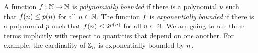 
A function $f : \mathbb{N} \to \mathbb{N}$ is \emph{polynomially bounded} if there is a
polynomial $p$ such that $f(n) \leq p(n)$ for all $n\in\mathbb{N}$.
The function $f$ is \emph{exponentially bounded} if there is a polynomial
$p$ such that $f(n) \leq 2^{p(n)}$ for all $n\in\mathbb{N}$.
We are going to use these terms implicitly with respect to quantities that
depend on one another. For example, the cardinality of $\mathbb{S}_{n}$ is
exponentially bounded by $n$.
